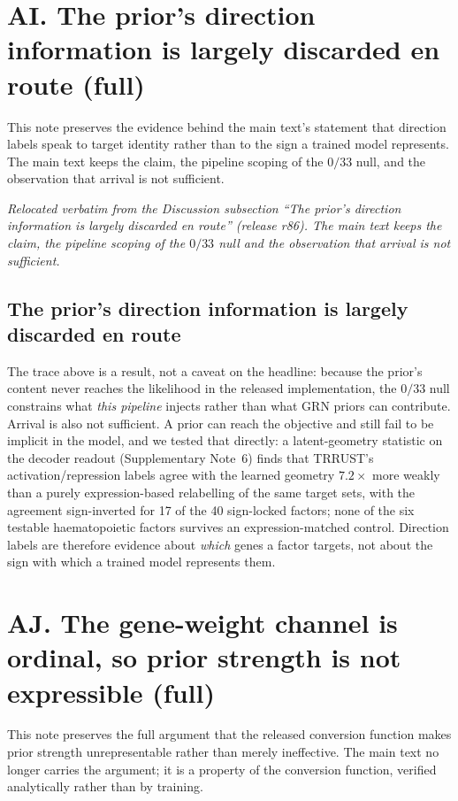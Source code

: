 \documentclass[11 pt,a4 paper]{article}
\begin{document}
\clearpage

\section*{AI. The prior's direction information is largely discarded en route (full)}

This note preserves the evidence behind the main text's statement that direction labels speak to
target identity rather than to the sign a trained model represents. The main text keeps the
claim, the pipeline scoping of the $0/33$ null, and the observation that arrival is not
sufficient.

\noindent\emph{Relocated verbatim from the Discussion subsection ``The prior's direction information is largely discarded en route'' (release r86). The main text keeps the claim, the pipeline scoping of the $0/33$ null and the observation that arrival is not sufficient.}

\subsection*{The prior's direction information is largely discarded en route}
The trace above is a result, not a caveat on the headline: because the prior's
content never reaches the likelihood in the released implementation, the $0/33$
null constrains what \emph{this pipeline} injects rather than what GRN priors can
contribute. Arrival is also not sufficient. A prior can reach the objective and
still fail to be implicit in the model, and we tested that directly: a
latent-geometry statistic on the decoder readout (Supplementary Note~6) finds that
TRRUST's activation/repression labels agree with the learned geometry
$7.2\times$ more weakly than a purely expression-based relabelling of the same
target sets, with the agreement sign-inverted for 17 of the 40 sign-locked
factors; none of the six testable haematopoietic factors survives an
expression-matched control. Direction labels are therefore evidence about
\emph{which} genes a factor targets, not about the sign with which a trained model
represents them.

\clearpage

\section*{AJ. The gene-weight channel is ordinal, so prior strength is not expressible (full)}

This note preserves the full argument that the released conversion function makes prior strength
unrepresentable rather than merely ineffective. The main text no longer carries the argument; it
is a property of the conversion function, verified analytically rather than by training.
\end{document}
